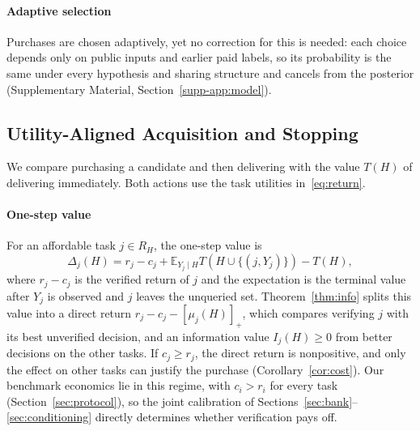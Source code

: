 \documentclass[journal]{IEEEtran}
\newcommand{\E}{\mathbb{E}}
\newcommand{\pos}[1]{[#1]_+}
\begin{document}
\paragraph{Adaptive selection}
Purchases are chosen adaptively, yet no correction for this is needed: each choice depends only on public inputs and earlier paid labels, so its probability is the same under every hypothesis and sharing structure and cancels from the posterior (Supplementary Material, Section~\ref{supp-app:model}).

\subsection{Utility-Aligned Acquisition and Stopping}
\label{sec:acquisition}

We compare purchasing a candidate and then delivering with the value $T(H)$ of delivering immediately. Both actions use the task utilities in~\eqref{eq:return}.

\paragraph{One-step value}
For an affordable task $j\in R_H$, the one-step value is
\begin{equation}
 \Delta_j(H)=r_j-c_j+\E_{Y_j\mid H}T(H\cup\{(j,Y_j)\})-T(H),
 \label{eq:gain}
\end{equation}
where $r_j-c_j$ is the verified return of $j$ and the expectation is the terminal value after $Y_j$ is observed and $j$ leaves the unqueried set. Theorem~\ref{thm:info} splits this value into a direct return $r_j-c_j-\pos{\mu_j(H)}$, which compares verifying $j$ with its best unverified decision, and an information value $I_j(H)\ge0$ from better decisions on the other tasks. If $c_j\ge r_j$, the direct return is nonpositive, and only the effect on other tasks can justify the purchase (Corollary~\ref{cor:cost}). Our benchmark economics lie in this regime, with $c_i>r_i$ for every task (Section~\ref{sec:protocol}), so the joint calibration of Sections~\ref{sec:bank}--\ref{sec:conditioning} directly determines whether verification pays off.
\end{document}

